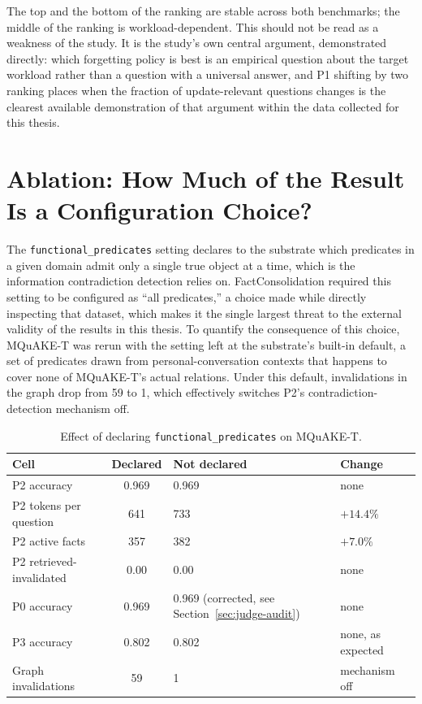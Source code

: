 The top and the bottom of the ranking are stable across both benchmarks; the middle of the ranking is workload-dependent. This should not be read as a weakness of the study. It is the study's own central argument, demonstrated directly: which forgetting policy is best is an empirical question about the target workload rather than a question with a universal answer, and P1 shifting by two ranking places when the fraction of update-relevant questions changes is the clearest available demonstration of that argument within the data collected for this thesis.

\section{Ablation: How Much of the Result Is a Configuration Choice?}
\label{sec:ablation}

The \texttt{functional\_predicates} setting declares to the substrate which predicates in a given domain admit only a single true object at a time, which is the information contradiction detection relies on. FactConsolidation required this setting to be configured as ``all predicates,'' a choice made while directly inspecting that dataset, which makes it the single largest threat to the external validity of the results in this thesis. To quantify the consequence of this choice, MQuAKE-T was rerun with the setting left at the substrate's built-in default, a set of predicates drawn from personal-conversation contexts that happens to cover none of MQuAKE-T's actual relations. Under this default, invalidations in the graph drop from 59 to 1, which effectively switches P2's contradiction-detection mechanism off.

\begin{table}[H]
\centering
\caption{Effect of declaring \texttt{functional\_predicates} on MQuAKE-T.}
\label{tab:ablation}
\small
\begin{tabular}{p{3.4cm}cp{2.6cm}l}
\toprule
Cell & Declared & Not declared & Change \\
\midrule
P2 accuracy & 0.969 & 0.969 & none \\
P2 tokens per question & 641 & 733 & $+14.4\%$ \\
P2 active facts & 357 & 382 & $+7.0\%$ \\
P2 retrieved-invalidated & 0.00 & 0.00 & none \\
P0 accuracy & 0.969 & 0.969 (corrected, see Section~\ref{sec:judge-audit}) & none \\
P3 accuracy & 0.802 & 0.802 & none, as expected \\
Graph invalidations & 59 & 1 & mechanism off \\
\bottomrule
\end{tabular}
\end{table}


